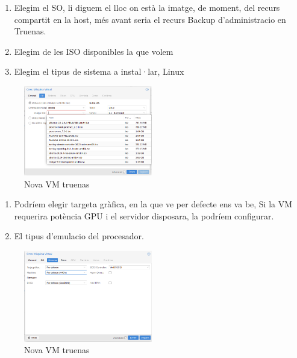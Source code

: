 \documentclass[
  10pt,
]{krantz}
\providecommand{\tightlist}{%
  \setlength{\itemsep}{0pt}\setlength{\parskip}{0pt}}
\begin{document}
\begin{enumerate}
\def\labelenumi{\arabic{enumi}.}
\setcounter{enumi}{3}
\tightlist
\item
  Elegim el SO, li diguem el lloc on està la imatge, de moment, del recurs compartit en la host, més avant seria el recurs Backup d'administracio en Truenas.
\item
  Elegim de les ISO disponibles la que volem
\item
  Elegim el tipus de sistema a instal·lar, Linux
\end{enumerate}

\begin{figure}
\centering
\includegraphics[width=0.5\textwidth,height=\textheight]{imatges/proxmox/install_truenas2.png}
\caption{Nova VM truenas}
\end{figure}

\begin{enumerate}
\def\labelenumi{\arabic{enumi}.}
\setcounter{enumi}{6}
\tightlist
\item
  Podríem elegir targeta gràfica, en la que ve per defecte ens va be, Si la VM requerira potència GPU i el servidor disposara, la podríem configurar.
\item
  El tipus d'emulacio del procesador.
\end{enumerate}

\begin{figure}
\centering
\includegraphics[width=0.5\textwidth,height=\textheight]{imatges/proxmox/install_truenas3.png}
\caption{Nova VM truenas}
\end{figure}
\end{document}
